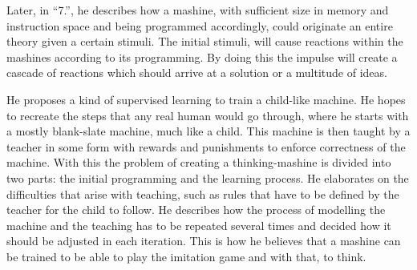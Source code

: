 \documentclass[12pt,a4paper]{article}
\begin{document}
{Later, in ``7.'', he describes how a mashine, with sufficient size in memory and instruction space and being programmed accordingly, could originate an entire theory given a certain stimuli.
The initial stimuli, will cause reactions within the mashines according to its programming.
By doing this the impulse will create a cascade of reactions which should arrive at a solution or a multitude of ideas.

He proposes a kind of supervised learning to train a child-like machine.
He hopes to recreate the steps that any real human would go through, where he starts with a mostly blank-slate machine, much like a child.
This machine is then taught by a teacher in some form with rewards and punishments to enforce correctness of the machine.
With this the problem of creating a thinking-mashine is divided into two parts: the initial programming and the learning process.
He elaborates on the difficulties that arise with teaching, such as rules that have to be defined by the teacher for the child to follow.
He describes how the process of modelling the machine and the teaching has to be repeated several times and decided how it should be adjusted in each iteration.
This is how he believes that a mashine can be trained to be able to play the imitation game and with that, to think.


}
\end{document}
